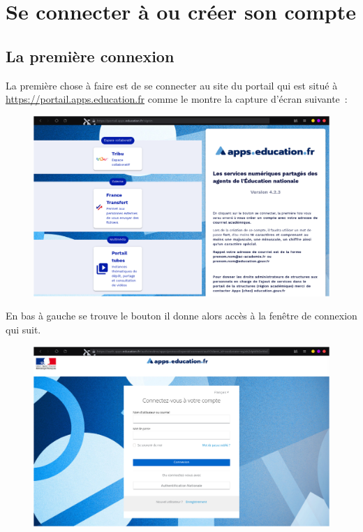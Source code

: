 \chapter{Se connecter à ou créer son compte}

\section{La première connexion}
La première chose à faire est de se connecter au site du portail qui est situé à \url{https://portail.apps.education.fr} comme le montre la capture d'écran suivante~:
\begin{figure}
    \centering
    \includegraphics[width=0.7071\linewidth]{Captures/portail.site.web.png}
\end{figure}

En bas à gauche se trouve le bouton  il donne alors accès à la fenêtre de connexion qui suit. 
\begin{figure}
	\centering
	\includegraphics{./Captures/portail.site.web.connexion.png}
\end{figure}

